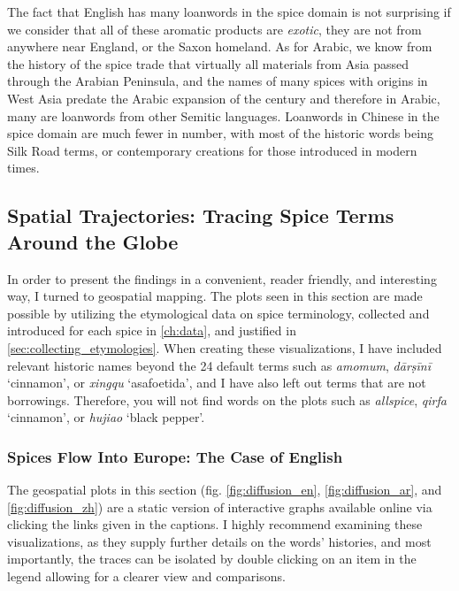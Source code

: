 The fact that English has many loanwords in the spice domain is not surprising if we consider that all of these aromatic products are \emph{exotic}, they are not from anywhere near England, or the Saxon homeland. As for Arabic, we know from the history of the spice trade that virtually all materials from Asia passed through the Arabian Peninsula, and the names of many spices with origins in West Asia predate the Arabic expansion of the  century and therefore in Arabic, many are loanwords from other Semitic languages. Loanwords in Chinese in the spice domain are much fewer in number, with most of the historic words being Silk Road terms, or contemporary creations for those introduced in modern times. 



\subsection{Spatial Trajectories: Tracing Spice Terms Around the Globe}

In order to present the findings in a convenient, reader friendly, and interesting way, I turned to geospatial mapping. The plots seen in this section are made possible by utilizing the etymological data on spice terminology, collected and introduced for each spice in \cref{ch:data}, and justified in \cref{sec:collecting_etymologies}. When creating these visualizations, I have included relevant historic names beyond the 24 default terms such as \textit{amomum}, \textit{dārṣīnī} `cinnamon', or \textit{xingqu} `asafoetida', and I have also left out terms that are not borrowings. Therefore, you will not find words on the plots such as \textit{allspice}, \textit{qirfa} `cinnamon', or \textit{hujiao} `black pepper'.

\subsubsection{Spices Flow Into Europe: The Case of English}


\begin{note}
  The geospatial plots in this section (fig. \ref{fig:diffusion_en}, \ref{fig:diffusion_ar}, and \ref{fig:diffusion_zh}) are a static version of interactive graphs available online via clicking the links given in the captions. I highly recommend examining these visualizations, as they supply further details on the words' histories, and most importantly, the traces can be isolated by double clicking on an item in the legend allowing for a clearer view and comparisons.
\end{note}

